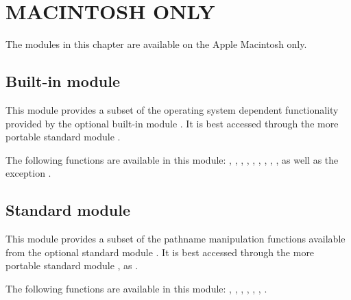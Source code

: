 \chapter{MACINTOSH ONLY}

The modules in this chapter are available on the Apple Macintosh only.

\section{Built-in module }

This module provides a subset of the operating system dependent
functionality provided by the optional built-in module .
It is best accessed through the more portable standard module
.

The following functions are available in this module:
,
,
,
,
,
,
,
,
,
as well as the exception .

\section{Standard module }

This module provides a subset of the pathname manipulation functions
available from the optional standard module .  It is
best accessed through the more portable standard module , as
.

The following functions are available in this module:
,
,
,
,
,
,
.
